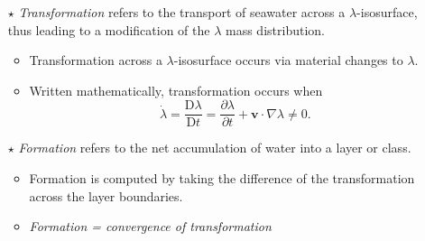 \documentclass[10pt]{beamer}
\begin{document}
\begin{frame}
\begin{exampleblock}{}
\begin{itemize}
  \item[$\star$] {\it Transformation} refers to the transport of
    seawater across a $\lambda$-isosurface, thus leading to a
    modification of the $\lambda$ mass distribution.
\begin{itemize}
      \scriptsize 
      \item Transformation across a $\lambda$-isosurface occurs
      via material changes to $\lambda$.  
     \item Written mathematically, transformation occurs when 
\begin{equation*}
  \dot{\lambda}  =  \frac{\mathrm{D} \lambda}{ \mathrm{D}t}
  = \frac{\partial \lambda}{\partial t} + {\bm v} \cdot \nabla \lambda \ne 0.
\end{equation*}
    \end{itemize}


  \item[$\star$] {\it Formation} refers to the net accumulation of
    water into a layer or class.  
\begin{itemize}
      \scriptsize 
    \item Formation is computed by taking the difference of the
      transformation across the layer boundaries.
     \item {\it Formation = convergence of transformation}
\end{itemize}


\end{itemize}
\end{exampleblock}{}

\end{frame}
\end{document}
